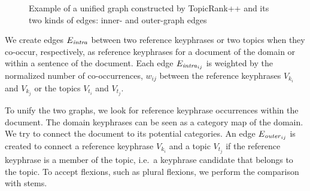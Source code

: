 \begin{figure*}
      \caption{Example of a unified graph constructed by TopicRank++ and its two
               kinds of edges: inner- and outer-graph edges
               \label{fig:topicrankpp_graph}}
    \end{figure*}

    We create edges $E_\textnormal{\textit{intra}}$ between two reference
    keyphrases or two topics when they co-occur, respectively, as reference
    keyphrases for a document of the domain or within a sentence of the
    document. Each edge $E_{\textnormal{\textit{intra}}_{ij}}$ is weighted by
    the normalized number of co-occurrences, $w_{ij}$ between the reference
    keyphrases $V_{k_i}$ and $V_{k_j}$ or the topics $V_{t_i}$ and $V_{t_j}$.

    To unify the two graphs, we look for reference keyphrase occurrences within
    the document. The domain keyphrases can be seen as a category map of the
    domain. We try to connect the document to its potential categories. An edge
    $E_{\textnormal{\textit{outer}}_{ij}}$ is created to connect a reference
    keyphrase $V_{k_i}$ and a topic $V_{t_j}$ if the reference keyphrase is a
    member of the topic, i.e.~a keyphrase candidate that belongs to the topic.
    To accept flexions, such as plural flexions, we perform the comparison with
    stems.

